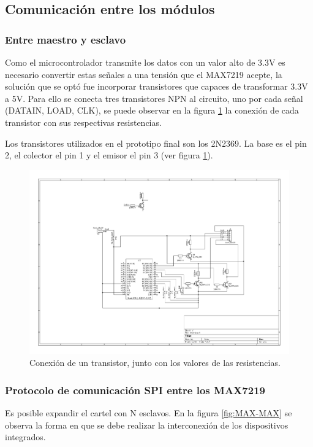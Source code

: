 \subsection{Comunicación entre los módulos}

\subsubsection{Entre maestro y esclavo}
Como el microcontrolador transmite los datos con un valor alto de 3.3V es necesario convertir estas señales a una tensión que el MAX7219 acepte, la solución que se optó fue incorporar transistores que capaces de transformar 3.3V a 5V. Para ello se conecta tres transistores NPN al circuito, uno por cada señal (DATAIN, LOAD, CLK), se puede observar en la figura \ref{fig:transistors} la conexión de cada transistor con sus respectivas resistencias.

Los transistores utilizados en el prototipo final son los 2N2369. %
La base es el pin 2, el colector el pin 1 y el emisor el pin 3 (ver figura \ref{fig:transistors}).

\begin{figure}[ht!]
	\centering
	\begin{center}
		\includegraphics[scale=2]{imagenes/hw/transistor.pdf}
		\caption{Conexión de un transistor, junto con los valores de las resistencias.}
		\label{fig:transistors}
	\end{center}
\end{figure}

\subsubsection{Protocolo de comunicación SPI entre los MAX7219} \label{sec:comunicacion}
Es posible expandir el cartel con N esclavos. En la figura \ref{fig:MAX-MAX} se observa la forma en que se debe realizar la interconexión de los dispositivos integrados.

